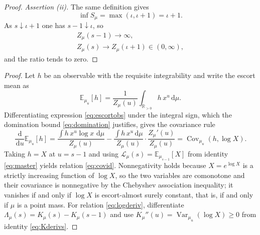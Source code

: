 \documentclass[sn-mathphys-num]{sn-jnl}
\theoremstyle{thmstyleone}%
\theoremstyle{thmstyletwo}%
\theoremstyle{thmstylethree}%
\theoremstyle{thmstyleone}%
\providecommand{\E}{\mathbb{E}}
\providecommand{\Var}{\operatorname{Var}}
\providecommand{\Cov}{\operatorname{Cov}}
\providecommand{\Rpos}{\mathbb{R}_{>0}}
\providecommand{\Leh}{\mathscr{L}}
\providecommand{\dd}{\,\mathrm{d}}
\begin{document}
\begin{appendices}
\begin{proof}
			\emph{Assertion (ii).} The same definition gives
			\begin{equation}\label{eq:infS}
				\inf S_\mu=\max(\iota,\iota+1)=\iota+1 .
			\end{equation}
			As $s\downarrow\iota+1$ one has $s-1\downarrow\iota$, so
			\begin{equation}\label{eq:leftlimits}
				\begin{gathered}
					Z_\mu(s-1)\longrightarrow\infty,\\
					Z_\mu(s)\longrightarrow Z_\mu(\iota+1)\in(0,\infty),
				\end{gathered}
			\end{equation}
			and the ratio tends to zero.
		\end{proof}
		
		\thmmono*
		
		\begin{proof}
			Let $h$ be an observable with the requisite integrability and
			write the escort mean as
			\begin{equation}\label{eq:escortobs}
				\E_{\mu_u}[h]=\frac{1}{Z_\mu(u)}\int_{\Rpos}h\,x^{u}\dd\mu .
			\end{equation}
			Differentiating expression \eqref{eq:escortobs} under the integral
			sign, which the domination bound \eqref{eq:domination} justifies,
			gives the covariance rule
			\begin{equation}\label{eq:covrule}
				\frac{\dd}{\dd u}\E_{\mu_u}[h]
				=\frac{\int h\,x^{u}\log x\,\dd\mu}{Z_\mu(u)}
				-\frac{\int h\,x^{u}\dd\mu}{Z_\mu(u)}
				\cdot\frac{Z_\mu'(u)}{Z_\mu(u)}
				=\Cov_{\mu_u}(h,\log X).
			\end{equation}
			Taking $h=X$ at $u=s-1$ and using
			$\Leh_\mu(s)=\E_{\mu_{s-1}}[X]$ from identity \eqref{eq:master}
			yields relation \eqref{eq:covid}. Nonnegativity holds because
			$X=e^{\log X}$ is a strictly increasing function of $\log X$, so
			the two variables are comonotone and their covariance is
			nonnegative by the Chebyshev association inequality; it vanishes
			if and only if $\log X$ is escort-almost surely constant, that is,
			if and only if $\mu$ is a point mass. For relation
			\eqref{eq:logderiv}, differentiate
			$\Lambda_\mu(s)=K_\mu(s)-K_\mu(s-1)$ and use
			$K_\mu''(u)=\Var_{\mu_u}(\log X)\ge0$ from identity \eqref{eq:Kderivs}.
		\end{proof}
		
		
		\propgruss*
		

\end{appendices}
\end{document}
